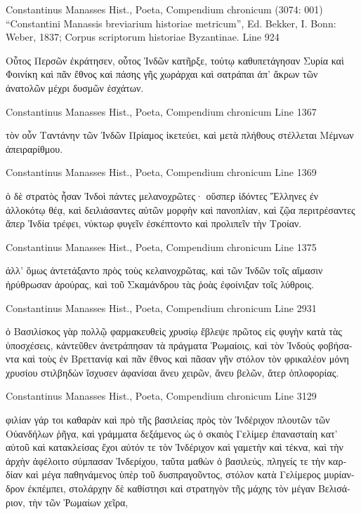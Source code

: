 \documentclass[12pt,letterpaper,twoside,final]{memoir}
\begin{document}
\begin{greek}


Constantinus Manasses Hist., Poeta, Compendium chronicum (3074: 001)
“Constantini Manassis breviarium historiae metricum”, Ed. Bekker, I.
Bonn: Weber, 1837; Corpus scriptorum historiae Byzantinae.
Line 924

Οὗτος Περσῶν ἐκράτησεν, οὗτος Ἰνδῶν κατῆρξε, 
τούτῳ καθυπετάγησαν Συρία καὶ Φοινίκη 
καὶ πᾶν ἔθνος καὶ πάσης γῆς χωράρχαι καὶ σατράπαι 
ἀπ' ἄκρων τῶν ἀνατολῶν μέχρι δυσμῶν ἐσχάτων. 



Constantinus Manasses Hist., Poeta, Compendium chronicum 
Line 1367

τὸν οὖν Ταντάνην τῶν Ἰνδῶν Πρίαμος ἱκετεύει, 
καὶ μετὰ πλήθους στέλλεται Μέμνων ἀπειραρίθμου. 



Constantinus Manasses Hist., Poeta, Compendium chronicum 
Line 1369

ὁ δὲ στρατὸς ἦσαν Ἰνδοὶ πάντες μελανοχρῶτες· 
οὕσπερ ἰδόντες Ἕλληνες ἐν ἀλλοκότῳ θέᾳ, 
καὶ δειλιάσαντες αὐτῶν μορφὴν καὶ πανοπλίαν, 
καὶ ζῷα περιτρέσαντες ἅπερ Ἰνδία τρέφει, 
νύκτωρ φυγεῖν ἐσκέπτοντο καὶ προλιπεῖν τὴν Τροίαν. 



Constantinus Manasses Hist., Poeta, Compendium chronicum 
Line 1375

ἀλλ' ὅμως ἀντετάξαντο πρὸς τοὺς κελαινοχρῶτας,   
καὶ τῶν Ἰνδῶν τοῖς αἵμασιν ἠρύθρωσαν ἀρούρας, 
καὶ τοῦ Σκαμάνδρου τὰς ῥοὰς ἐφοίνιξαν τοῖς λύθροις. 



Constantinus Manasses Hist., Poeta, Compendium chronicum 
Line 2931

ὁ Βασιλίσκος γὰρ πολλῷ φαρμακευθεὶς χρυσίῳ 
ἔβλεψε πρῶτος εἰς φυγὴν κατὰ τὰς ὑποσχέσεις, 
κἀντεῦθεν ἀνετράπησαν τὰ πράγματα Ῥωμαίοις, 
καὶ τὸν Ἰνδοὺς φοβήσαντα καὶ τοὺς ἐν Βρεττανίᾳ 
καὶ πᾶν ἔθνος καὶ πᾶσαν γῆν στόλον τὸν φρικαλέον   
μόνη χρυσίου στιλβηδὼν ἴσχυσεν ἀφανίσαι 
ἄνευ χειρῶν, ἄνευ βελῶν, ἄτερ ὁπλοφορίας. 



Constantinus Manasses Hist., Poeta, Compendium chronicum 
Line 3129

φιλίαν γάρ τοι καθαρὰν καὶ πρὸ τῆς βασιλείας   
πρὸς τὸν Ἰνδέριχον πλουτῶν τῶν Οὐανδήλων ῥῆγα, 
καὶ γράμματα δεξάμενος ὡς ὁ σκαιὸς Γελίμερ 
ἐπανασταίη κατ' αὐτοῦ καὶ κατακλείσας ἔχοι 
αὐτόν τε τὸν Ἰνδέριχον καὶ γαμετὴν καὶ τέκνα, 
καὶ τὴν ἀρχὴν ἀφέλοιτο σύμπασαν Ἰνδερίχου, 
ταῦτα μαθὼν ὁ βασιλεύς, πληγείς τε τὴν καρδίαν 
καὶ μέγα παθηνάμενος ὑπὲρ τοῦ δυσπραγοῦντος, 
στόλον κατὰ Γελίμερος μυρίανδρον ἐκπέμπει, 
στολάρχην δὲ καθίστησι καὶ στρατηγὸν τῆς μάχης 
τὸν μέγαν Βελισάριον, τὴν τῶν Ῥωμαίων χεῖρα, 


\end{greek}
\end{document}
